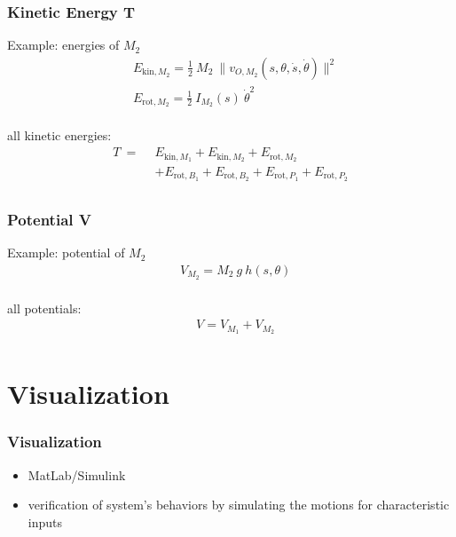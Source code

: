 \documentclass{beamer}
\begin{document}
\begin{frame}
	\frametitle{Kinetic Energy T}
	
	Example: energies of $M_2$ 
	\begin{align*}
		&E_{\text{kin},M_2} = \frac{1}{2}\ M_2\ \| 
		v_{O,M_2}(s,\theta,\dot{s},\dot{\theta}) \|^2 \\
		&E_{\text{rot},M_2} = \frac{1}{2}\ I_{M_2}(s)\ \dot{\theta}^2 \\
	\end{align*}
	
	all kinetic energies:
	\begin{align*}
	T\ =\ \ & E_{\text{kin},M_1} + E_{\text{kin},M_2} + E_{\text{rot},M_2}  \\
	& + E_{\text{rot},B_1} + E_{\text{rot},B_2} + E_{\text{rot},P_1} + E_{\text{rot},P_2} \\
	\end{align*}
\end{frame}

\begin{frame}
	\frametitle{Potential V}
	
	Example: potential of $M_2$
	\begin{align*}
		& V_{M_2} = M_2\ g\ h(s,\theta) \\
	\end{align*}
	
	all potentials:
	\begin{align*}
		& V = V_{M_1} + V_{M_2} \\
	\end{align*}
\end{frame}


\section{Visualization}

\begin{frame}[c]
	\frametitle{Visualization}
	\begin{itemize}
		\item{MatLab/Simulink}
		\vspace{0.5cm}
		\item{verification of system's behaviors by simulating the motions for characteristic inputs}
	\end{itemize}
\end{frame}
\end{document}
